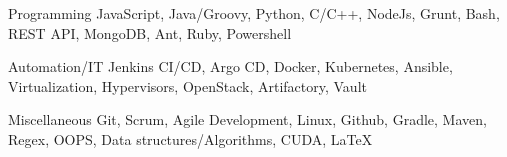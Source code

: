 

\begin{cvskills}

  \cvskill
    {Programming} %
    {JavaScript, Java/Groovy, Python, C/C++, NodeJs, Grunt, Bash, REST API, MongoDB, Ant, Ruby, Powershell} %

  \cvskill
    {Automation/IT} %
    {Jenkins CI/CD, Argo CD, Docker, Kubernetes, Ansible, Virtualization, Hypervisors, OpenStack, Artifactory, Vault} %

  \cvskill
    {Miscellaneous} %
    {Git, Scrum, Agile Development, Linux, Github, Gradle, Maven, Regex, OOPS, Data structures/Algorithms, CUDA, \LaTeX} %

\end{cvskills}

\vspace{-1mm}